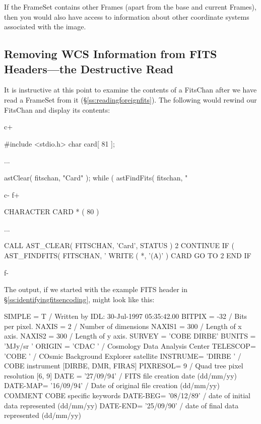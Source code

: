 \documentclass[twoside,11pt]{starlink}
\providecommand{\secref}[1]{\S\ref{#1}}
\begin{document}
If the FrameSet contains other Frames (apart from the base and current
Frames), then you would also have access to information about other
coordinate systems associated with the image.

\subsection{\label{ss:destructiveread}Removing WCS Information from FITS Headers---the Destructive Read}

It is instructive at this point to examine the contents of a FitsChan
after we have read a FrameSet from it
(\secref{ss:readingforeignfits}). The following would rewind our
FitsChan and display its contents:

c+
\small
\begin{terminalv}
#include <stdio.h>
char card[ 81 ];

...

astClear( fitschan, "Card" );
while ( astFindFits( fitschan, "%
\end{terminalv}
\normalsize
c-
f+
\small
\begin{terminalv}
      CHARACTER CARD * ( 80 )

      ...

      CALL AST_CLEAR( FITSCHAN, 'Card', STATUS )
 2    CONTINUE
      IF ( AST_FINDFITS( FITSCHAN, '%
         WRITE ( *, '(A)' ) CARD
         GO TO 2
      END IF
\end{terminalv}
\normalsize
f-

The output, if we started with the example FITS header in
\secref{ss:identifyingfitsencoding}, might look like this:

\small
\begin{terminalv}
SIMPLE  =                    T /  Written by IDL:  30-Jul-1997 05:35:42.00
BITPIX  =                  -32 /  Bits per pixel.
NAXIS   =                    2 /  Number of dimensions
NAXIS1  =                  300 /  Length of x axis.
NAXIS2  =                  300 /  Length of y axis.
SURVEY  = 'COBE DIRBE'
BUNITS  = 'MJy/sr  '
ORIGIN  = 'CDAC    '           /  Cosmology Data Analysis Center
TELESCOP= 'COBE    '           /  COsmic Background Explorer satellite
INSTRUME= 'DIRBE   '           /  COBE instrument [DIRBE, DMR, FIRAS]
PIXRESOL=                    9 /  Quad tree pixel resolution [6, 9]
DATE    = '27/09/94'           /  FITS file creation date (dd/mm/yy)
DATE-MAP= '16/09/94'           /  Date of original file creation (dd/mm/yy)
COMMENT     COBE specific keywords
DATE-BEG= '08/12/89'           /  date of initial data represented (dd/mm/yy)
DATE-END= '25/09/90'           /  date of final data represented   (dd/mm/yy)
\end{terminalv}
\normalsize
\end{document}
